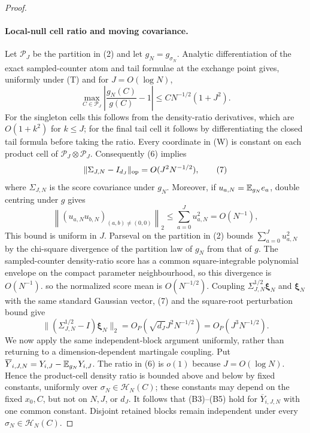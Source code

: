 \begin{proof}
\paragraph{Local-null cell ratio and moving covariance.}
Let $\mathcal P_J$ be the partition in \textup{(2)} and let
$g_N=g_{\sigma_N}$.  Analytic differentiation of the exact sampled-counter
atom and tail formulae at the exchange point gives, uniformly under
\textup{(T)} and for $J=O(\log N)$,
\[
 \max_{C\in\mathcal P_J}
 \left|\frac{g_N(C)}{g(C)}-1\right|
 \leq C N^{-1/2}(1+J^2).
 \tag{6}
\]
For the singleton cells this follows from the density-ratio derivatives,
which are $O(1+k^2)$ for $k\leq J$; for the final tail cell it follows by
differentiating the closed tail formula before taking the ratio.  Every
coordinate in \textup{(W)} is constant on each product cell of
$\mathcal P_J\otimes\mathcal P_J$.  Consequently \textup{(6)} implies
\[
 \|\Sigma_{J,N}-I_{d_J}\|_{\rm op}=O(J^2N^{-1/2}),
 \tag{7}
\]
where $\Sigma_{J,N}$ is the score covariance under $g_N$.  Moreover, if
$u_{a,N}=\mathbb E_{g_N}e_a$, double centring under $g$ gives
\[
 \left\|(u_{a,N}u_{b,N})_{(a,b)\neq(0,0)}\right\|_2
 \leq\sum_{a=0}^J u_{a,N}^2=O(N^{-1}),
\tag{8}
\]
This bound is uniform in $J$.  Parseval on the partition in \textup{(2)}
bounds $\sum_{a=0}^Ju_{a,N}^2$ by the chi-square divergence of the partition
law of $g_N$ from that of $g$.  The sampled-counter density-ratio score has a
common square-integrable polynomial envelope on the compact parameter
neighbourhood, so this divergence is $O(N^{-1})$.
so the normalized score mean is $O(N^{-1/2})$.  Coupling
$\Sigma_{J,N}^{1/2}\boldsymbol\xi_N$ and $\boldsymbol\xi_N$ with the same
standard Gaussian vector, \textup{(7)} and the square-root perturbation
bound give
\[
 \|(\Sigma_{J,N}^{1/2}-I)\boldsymbol\xi_N\|_2
 =O_P(\sqrt{d_J}J^2N^{-1/2})=O_P(J^3N^{-1/2}).
 \tag{9}
\]
We now apply the same independent-block argument uniformly, rather than
returning to a dimension-dependent martingale coupling.  Put
$\overline Y_{i,J,N}=Y_{i,J}-\mathbb E_{g_N}Y_{i,J}$.  The ratio in
\textup{(6)} is $o(1)$ because $J=O(\log N)$.  Hence the product-cell
density ratio is bounded above and below by fixed constants, uniformly over
$\sigma_N\in\mathcal H_N(C)$; these constants may depend on the fixed
$x_0,C$, but not on $N,J$, or $d_J$.  It follows that
\textup{(B3)}--\textup{(B5)} hold for
$\overline Y_{i,J,N}$ with one common constant.  Disjoint retained blocks
remain independent under every $\sigma_N\in\mathcal H_N(C)$.


\end{proof}
